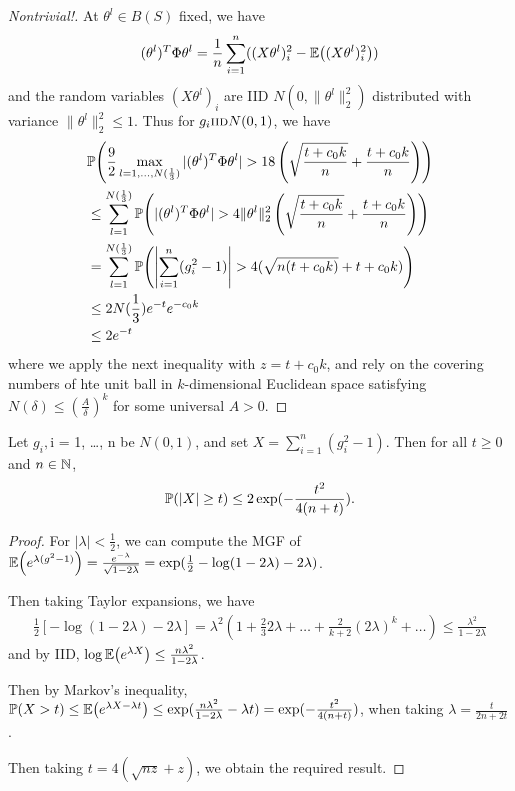 \begin{proof}[Nontrivial!]
  At $\theta^{l} \in B(S)$ fixed, we have
  \begin{align}
    \label{eq:77}
    (\theta^{l})^{T} \Phi \theta^{l} = \frac{1}{n} \sum_{i=1}^{n} ((X
    \theta^{l})_{i}^{2} - \E{(X \theta^{l})_{i}^{2}})
  \end{align} and the random variables $(X \theta^{l})_{i}$ are IID
  $N(0, \| \theta^{l}\|_{2}^{2})$ distributed with variance $\|
  \theta^{l} \|_{2}^{2} \leq 1$.  Thus for $g_{i} \textsc{iid} N(0, 1)$, we
  have
  \begin{align}
    \label{eq:78}
    &\Prob{\frac{9}{2} \max_{l = 1, \dots, N(\frac{1}{3})} |
      (\theta^{l})^{T} \Phi \theta^{l} | > 18 \left(\sqrt{\frac{t +
            c_{0} k}{n}} + \frac{t + c_{0} k}{n} \right)} \\
    &\leq \sum_{l=1}^{N(\frac{1}{3})} \Prob{|(\theta^{l})^{T} \Phi
      \theta^{l}| > 4 \| \theta^{l} \|_{2}^{2} \left( \sqrt{\frac{t +
            c_{0} k}{n}} + \frac{t + c_{0} k}{n} \right)} \\
    &= \sum_{l=1}^{N(\frac{1}{3})}  \Prob{\left|\sum_{i=1}^{n} (g_{i}^{2} -
        1) \right| > 4 (\sqrt{n(t+ c_{0}k)} + t + c_{0}k)} \\
    &\leq 2N(\frac{1}{3} )e^{-t} e^{-c_{0} k} \\
    &\leq 2e^{-t}
  \end{align} where we apply the next inequality with $z = t +
  c_{0}k$, and rely on the covering numbers of hte unit ball in
  $k$-dimensional Euclidean space satisfying $N(\delta) \leq
  \left(\frac{A}{\delta}\right)^{k}$ for some universal $A > 0$.
\end{proof}

\begin{thm}
  Let $g_{i}, $i = 1, \dots, n be \iid $N(0, 1)$, and set $X =
  \sum_{i=1}^{n} (g_{i}^{2} - 1)$.  Then for all $t \geq 0$ and $n \in
  \mathbb{N}$,
  \begin{equation}
    \label{eq:40}
    \Prob{|X| \geq t} \leq 2 \exp(-\frac{t^{2}}{4(n+t)}).
  \end{equation}
\end{thm}

\begin{proof}
  For $| \lambda | < \frac{1}{2}$, we can compute the MGF of
  $\E{e^{\lambda(g^{2} - 1)}} = \frac{e^{-\lambda}}{\sqrt{1 -
      2\lambda}} = \exp(\frac{1}{2} -\log(1 - 2 \lambda) - 2
  \lambda)$.

  Then taking Taylor expansions, we have
  \begin{align}
    \label{eq:66}
    \frac{1}{2} [- \log (1 - 2 \lambda) - 2 \lambda] = \lambda^{2} (1
    + \frac{2}{3} 2 \lambda + \dots + \frac{2}{k+2}(2\lambda)^{k} +
    \dots) \leq \frac{\lambda^{2}}{1 - 2 \lambda}
  \end{align} and by IID, $\log \E{e^{\lambda X}} \leq \frac{n
    \lambda^{2}}{1 - 2 \lambda} $.

  Then by Markov's inequality, $\Prob{X > t} \leq \E{e^{\lambda X -
      \lambda t}} \leq \exp(\frac{n\lambda^{2}}{1-2\lambda} - \lambda
  t) = \exp(-\frac{t^{2}}{4(n+t)})$, when taking $\lambda =
  \frac{t}{2n + 2t}$.

  Then taking $t = 4(\sqrt{nz} + z)$, we obtain the required result.
\end{proof}



